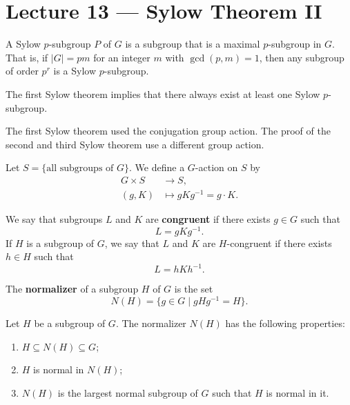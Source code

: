 \section{Lecture 13 — Sylow Theorem II}

\begin{definition}
	A Sylow $p$-subgroup $P$ of $G$ is a subgroup that is a maximal $p$-subgroup in $G$. That is, if $|G|=pm$ for an integer $m$ with $\gcd(p,m)=1$, then any subgroup of order $p^r$ is a Sylow $p$-subgroup.
\end{definition}

\begin{remark}
	The first Sylow theorem implies that there always exist at least one Sylow $p$-subgroup.
\end{remark}

The first Sylow theorem used the conjugation group action. The proof of the second and third Sylow theorem use a different group action.

Let $S=\{\text{all subgroups of $G$}\}$. We define a $G$-action on $S$ by
\begin{align*}
	G\times S &\to S,\\
	(g,K) &\mapsto gKg^{-1}=g\cdot K.
\end{align*}

\begin{definition}
	We say that subgroups $L$ and $K$ are \textbf{congruent} if there exists $g\in G$ such that
	$$L=gKg^{-1}.$$
	If $H$ is a subgroup of $G$, we say that $L$ and $K$ are $H$-congruent if there exists $h\in H$ such that
	$$L=hKh^{-1}.$$
\end{definition}

\begin{definition}[normalizer]
	The \textbf{normalizer} of a subgroup $H$ of $G$ is the set
	$$N(H)=\{g\in G\mid gHg^{-1}=H\}.$$
\end{definition}

\begin{proposition}
	Let $H$ be a subgroup of $G$. The normalizer $N(H)$ has the following properties:
	\begin{enumerate}
		\item $H\subseteq N(H)\subseteq G$;
		\item $H$ is normal in $N(H)$;
		\item $N(H)$ is the largest normal subgroup of $G$ such that $H$ is normal in it.
	\end{enumerate}
\end{proposition}

